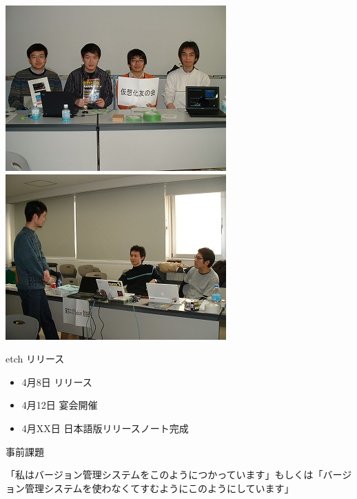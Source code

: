 \documentclass[cjk,dvipdfmx,12pt]{beamer}
\begin{document}
\begin{frame}
 \includegraphics[width=0.5\hsize]{image200704/DSCF0063.jpg}
 \includegraphics[width=0.5\hsize]{image200704/DSCF0064.jpg}
\end{frame}

\begin{frame}{etch リリース}
\begin{itemize}
 \item 4月8日 リリース
 \item 4月12日 宴会開催
 \item 4月XX日 日本語版リリースノート完成
\end{itemize}
\end{frame}

\begin{frame}

事前課題

「私はバージョン管理システムをこのようにつかっています」もしくは「バージョン管理システムを使わなくてすむようにこのようにしています」

\end{frame}
\end{document}
